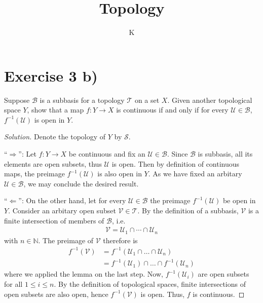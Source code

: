 \documentclass[a4paper]{article}
\title{Topology}
\author{K}
\begin{document}
\section*{Exercise 3 b)}
Suppose \(\mathcal{B}\) is a subbasis for a topology \(\mathcal{T}\) on a set \(X\). Given another topological space \(Y\), show that a map \(f: Y \longrightarrow X\) is continuous if and only if for every \(\mathcal{U} \in \mathcal{B}\), \(f^{-1}(\mathcal{U})\) is open in \(Y\).

\begin{proof}[Solution]
    Denote the topology of \(Y\) by \(\mathcal{S}\).

    ``\(\Rightarrow\)'': Let \(f: Y \longrightarrow X\) be continuous and fix an \(\mathcal{U} \in \mathcal{B}\). Since \(\mathcal{B}\) is subbasis, all its elements are open subsets, thus \(\mathcal{U}\) is open. Then by definition of continuous maps, the preimage \(f^{-1}(\mathcal{U})\) is also open in \(Y\). As we have fixed an arbitary \(\mathcal{U} \in \mathcal{B}\), we may conclude the desired result.

    ``\(\Leftarrow\)'': On the other hand, let for every \(\mathcal{U} \in \mathcal{B}\) the preimage \(f^{-1}(\mathcal{U})\) be open in \(Y\). Consider an arbitary open subset \(\mathcal{V} \in \mathcal{T}\). By the definition of a subbasis, \(\mathcal{V}\) is a finite intersection of members of \(\mathcal{B}\), i.e.
    \begin{align*}
        \mathcal{V} = \mathcal{U}_1 \cap \cdots \cap \mathcal{U}_n
    \end{align*}
    with \(n \in \mathbb{N}\). The preimage of \(\mathcal{V}\) therefore is
    \begin{align*}
        f^{-1}(\mathcal{V}) &= f^{-1}(\mathcal{U}_1 \cap \ldots \cap \mathcal{U}_n) \\
        &= f^{-1}(\mathcal{U}_1) \cap \ldots \cap f^{-1}(\mathcal{U}_n)
    \end{align*}
    where we applied the lemma on the last step. Now, \(f^{-1}(\mathcal{U}_i)\) are open subsets for all \(1 \leq i \leq n\). By the definition of topological spaces, finite intersections of open subsets are also open, hence \(f^{-1}(\mathcal{V})\) is open. Thus, \(f\) is continuous.
\end{proof}
\end{document}

